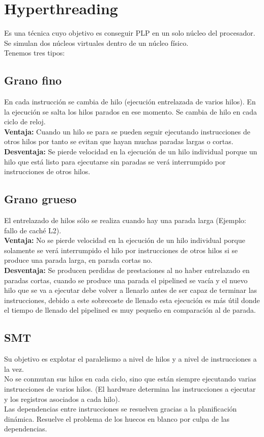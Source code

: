 \documentclass[11pt,letterpaper]{article}
\begin{document}
\section{Hyperthreading}
\noindent
Es una técnica cuyo objetivo es conseguir PLP en un solo núcleo del procesador. Se simulan dos núcleos virtuales dentro de un núcleo físico.\\
Tenemos tres tipos:
\subsection{Grano fino}
\noindent
En cada instrucción se cambia de hilo (ejecución entrelazada de varios hilos). En la ejecución se salta los hilos parados en ese momento. Se cambia de hilo en cada ciclo de reloj.\\
\textbf{Ventaja:}  Cuando un hilo se para se pueden seguir ejecutando instrucciones de otros hilos por tanto se evitan que hayan muchas paradas largas o cortas.\\
\textbf{Desventaja: }Se pierde velocidad en la ejecución de un hilo individual porque un hilo que está listo para ejecutarse sin paradas se verá interrumpido por instrucciones de otros hilos.
\subsection{Grano grueso}
\noindent
El entrelazado de hilos sólo se realiza cuando hay una parada larga (Ejemplo: fallo de caché L2).\\
\textbf{Ventaja:} No se pierde velocidad en la ejecución de un hilo individual porque solamente se verá interrumpido el hilo por instrucciones de otros hilos si se produce una parada larga, en parada cortas no.\\
\textbf{Desventaja:} Se producen perdidas de prestaciones al no haber entrelazado en paradas cortas, cuando se produce una parada el pipelined se vacía y el nuevo hilo que se va a ejecutar debe volver a llenarlo antes de ser capaz de terminar las instrucciones, debido a este sobrecoste de llenado esta ejecución es más útil donde el tiempo de llenado del pipelined es muy pequeño en comparación al de parada.
\subsection{SMT}
\noindent
Su objetivo es explotar el paralelismo a nivel de hilos y a nivel de instrucciones a la vez.\\
No se conmutan sus hilos en cada ciclo, sino que están siempre ejecutando varias instrucciones de varios hilos. (El hardware determina las instrucciones a ejecutar y los registros asociados a cada hilo).\\
Las dependencias entre instrucciones se resuelven gracias a la planificación dinámica.
Resuelve el problema de los huecos en blanco por culpa de las dependencias.
\end{document}
